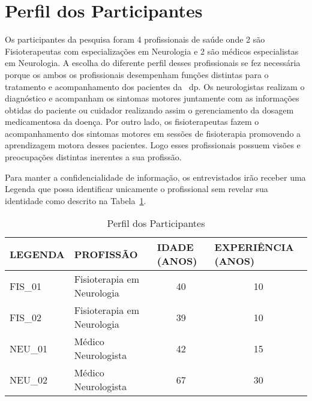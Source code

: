 \section{Perfil dos Participantes}
Os participantes da pesquisa foram 4 profissionais de saúde onde 2 são Fisioterapeutas com especializações em Neurologia e 2 são médicos especialistas em Neurologia. A escolha do diferente perfil desses profissionais se fez necessária porque os ambos os profissionais desempenham funções distintas para o tratamento e acompanhamento dos pacientes da ~\ac{dp}. Os neurologistas realizam o diagnóstico e acompanham os sintomas motores juntamente com as informações obtidas do paciente ou cuidador realizando assim o gerenciamento da dosagem medicamentosa da doença. Por outro lado, os fisioterapeutas fazem o acompanhamento dos sintomas motores em sessões de fisioterapia promovendo a aprendizagem motora desses pacientes. Logo esses profissionais possuem visões e preocupações distintas inerentes a sua profissão. 


Para manter a confidencialidade de informação, os entrevistados irão receber uma Legenda que possa identificar unicamente o profissional sem revelar sua identidade como descrito na Tabela~\ref{table:perfil_analise_participantes}.

\begin{table}[h]
\caption{Perfil dos Participantes}
\label{table:perfil_analise_participantes}
\begin{tabular}{|l|l|c|c|}
\hline
\textbf{LEGENDA} & \textbf{PROFISSÃO}             & \multicolumn{1}{|l}{\textbf{IDADE (ANOS)}} & \multicolumn{1}{|l|}{\textbf{EXPERIÊNCIA (ANOS)}} \\ \hline
FIS\_01          & Fisioterapia em Neurologia & 40                                         & 10                                                \\ \hline
FIS\_02          & Fisioterapia em Neurologia     & 39                                         & 10                                                \\ \hline
NEU\_01          & Médico Neurologista            & 42                                         & 15                                                \\ \hline
NEU\_02          & Médico Neurologista            & 67                                         & 30                                                \\ \hline
\end{tabular}

\end{table}

